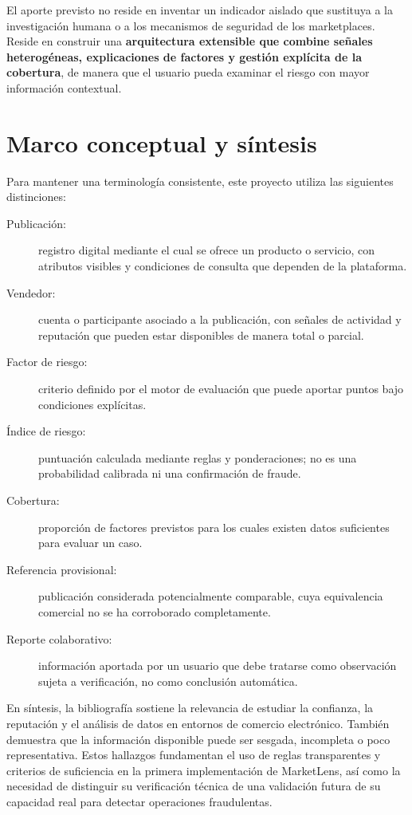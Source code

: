 El aporte previsto no reside en inventar un indicador aislado que sustituya a la investigación humana o a los mecanismos de seguridad de los marketplaces. Reside en construir una \textbf{arquitectura extensible que combine señales heterogéneas, explicaciones de factores y gestión explícita de la cobertura}, de manera que el usuario pueda examinar el riesgo con mayor información contextual.

\section{Marco conceptual y síntesis}\label{sec:ml-marco-conceptual}

Para mantener una terminología consistente, este proyecto utiliza las siguientes distinciones:

\begin{description}
    \item[Publicación:] registro digital mediante el cual se ofrece un producto o servicio, con atributos visibles y condiciones de consulta que dependen de la plataforma.
    \item[Vendedor:] cuenta o participante asociado a la publicación, con señales de actividad y reputación que pueden estar disponibles de manera total o parcial.
    \item[Factor de riesgo:] criterio definido por el motor de evaluación que puede aportar puntos bajo condiciones explícitas.
    \item[Índice de riesgo:] puntuación calculada mediante reglas y ponderaciones; no es una probabilidad calibrada ni una confirmación de fraude.
    \item[Cobertura:] proporción de factores previstos para los cuales existen datos suficientes para evaluar un caso.
    \item[Referencia provisional:] publicación considerada potencialmente comparable, cuya equivalencia comercial no se ha corroborado completamente.
    \item[Reporte colaborativo:] información aportada por un usuario que debe tratarse como observación sujeta a verificación, no como conclusión automática.
\end{description}

En síntesis, la bibliografía sostiene la relevancia de estudiar la confianza, la reputación y el análisis de datos en entornos de comercio electrónico. También demuestra que la información disponible puede ser sesgada, incompleta o poco representativa. Estos hallazgos fundamentan el uso de reglas transparentes y criterios de suficiencia en la primera implementación de MarketLens, así como la necesidad de distinguir su verificación técnica de una validación futura de su capacidad real para detectar operaciones fraudulentas.

